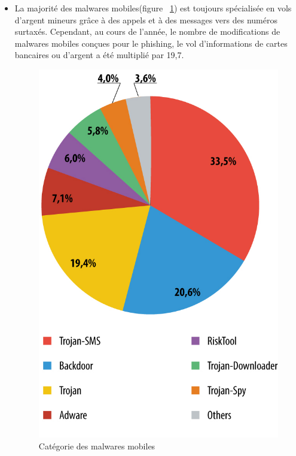 \begin{itemize}
\item La majorité des malwares mobiles(figure ~\ref{fig :mobile2}) est toujours spécialisée en vols d’argent mineurs grâce à des appels et à des messages vers des numéros surtaxés. Cependant, au cours de l’année, le nombre de modifications de malwares mobiles conçues pour le phishing, le vol d’informations de cartes bancaires ou d’argent a été multiplié par 19,7.
\begin{figure}[H]
\begin{center}
\includegraphics[scale=0.36]{Figures/mobile2.jpg}
\caption{Catégorie des malwares mobiles}
\label{fig :mobile2} 
\end{center}
\end{figure}

\end{itemize}
